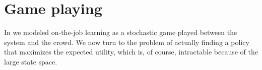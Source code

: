 \section{Game playing}
\label{sec:game-playing}

In  we modeled on-the-job learning as a stochastic game played between the system and the crowd.
We now turn to the problem of actually finding a policy that maximizes the expected utility,
which is, of course, intractable because of the large state space.




